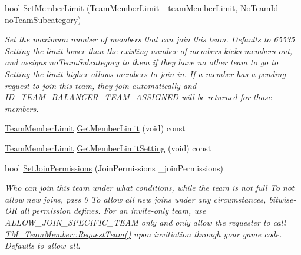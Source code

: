 \begin{DoxyCompactItemize}
\item 
bool \hyperlink{class_rak_net_1_1_t_m___team_a87a78e948571d83b71d5cf017466e597}{Set\-Member\-Limit} (\hyperlink{group___t_e_a_m___m_a_n_a_g_e_r___g_r_o_u_p_ga236290d3c5e0d6b3b4559ba851f02bed}{Team\-Member\-Limit} \-\_\-team\-Member\-Limit, \hyperlink{group___t_e_a_m___m_a_n_a_g_e_r___g_r_o_u_p_gadd1e99b7724ceb0f6794f46de31a6b02}{No\-Team\-Id} no\-Team\-Subcategory)
\begin{DoxyCompactList}\small\item\em Set the maximum number of members that can join this team. Defaults to 65535 Setting the limit lower than the existing number of members kicks members out, and assigns no\-Team\-Subcategory to them if they have no other team to go to Setting the limit higher allows members to join in. If a member has a pending request to join this team, they join automatically and I\-D\-\_\-\-T\-E\-A\-M\-\_\-\-B\-A\-L\-A\-N\-C\-E\-R\-\_\-\-T\-E\-A\-M\-\_\-\-A\-S\-S\-I\-G\-N\-E\-D will be returned for those members. \end{DoxyCompactList}\item 
\hyperlink{group___t_e_a_m___m_a_n_a_g_e_r___g_r_o_u_p_ga236290d3c5e0d6b3b4559ba851f02bed}{Team\-Member\-Limit} \hyperlink{class_rak_net_1_1_t_m___team_a6ed06f391bde64b4236888add1b24d45}{Get\-Member\-Limit} (void) const 
\item 
\hyperlink{group___t_e_a_m___m_a_n_a_g_e_r___g_r_o_u_p_ga236290d3c5e0d6b3b4559ba851f02bed}{Team\-Member\-Limit} \hyperlink{class_rak_net_1_1_t_m___team_aed0b3d7b34bcd78e75ab9eee20de29fa}{Get\-Member\-Limit\-Setting} (void) const 
\item 
bool \hyperlink{class_rak_net_1_1_t_m___team_a2b6e3fd997f75116a4edcf81457d34ee}{Set\-Join\-Permissions} (Join\-Permissions \-\_\-join\-Permissions)
\begin{DoxyCompactList}\small\item\em Who can join this team under what conditions, while the team is not full To not allow new joins, pass 0 To allow all new joins under any circumstances, bitwise-\/\-O\-R all permission defines. For an invite-\/only team, use A\-L\-L\-O\-W\-\_\-\-J\-O\-I\-N\-\_\-\-S\-P\-E\-C\-I\-F\-I\-C\-\_\-\-T\-E\-A\-M only and only allow the requester to call \hyperlink{class_rak_net_1_1_t_m___team_member_a964be9af8c1d4e91367406379502ef56}{T\-M\-\_\-\-Team\-Member\-::\-Request\-Team()} upon invitiation through your game code. Defaults to allow all. \end{DoxyCompactList}\item 

\end{DoxyCompactItemize}
